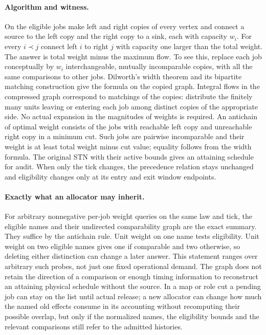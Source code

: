 \documentclass[11pt]{article}
\begin{document}
\paragraph{Algorithm and witness.}
On the eligible jobs make left and right copies of every vertex and connect a source to the left copy and the right copy to a sink, each with capacity $w_i$. For every $i\prec j$ connect left $i$ to right $j$ with capacity one larger than the total weight. The answer is total weight minus the maximum flow. To see this, replace each job conceptually by $w_i$ interchangeable, mutually incomparable copies, with all the same comparisons to other jobs. Dilworth's width theorem and its bipartite matching construction give the formula on the copied graph. Integral flows in the compressed graph correspond to matchings of the copies: distribute the finitely many units leaving or entering each job among distinct copies of the appropriate side. No actual expansion in the magnitudes of weights is required. An antichain of optimal weight consists of the jobs with reachable left copy and unreachable right copy in a minimum cut. Such jobs are pairwise incomparable and their weight is at least total weight minus cut value; equality follows from the width formula. The original STN with their active bounds gives an attaining schedule for audit. When only the tick changes, the precedence relation stays unchanged and eligibility changes only at its entry and exit window endpoints.

\paragraph{Exactly what an allocator may inherit.}
For arbitrary nonnegative per-job weight queries on the same law and tick, the eligible names and their undirected comparability graph are the exact summary. They suffice by the antichain rule. Unit weight on one name tests eligibility. Unit weight on two eligible names gives one if comparable and two otherwise, so deleting either distinction can change a later answer. This statement ranges over arbitrary such probes, not just one fixed operational demand. The graph does not retain the direction of a comparison or enough timing information to reconstruct an attaining physical schedule without the source. In a map or role cut a pending job can stay on the list until actual release; a new allocator can change how much the named old effects consume in its accounting without recomputing their possible overlap, but only if the normalized names, the eligibility bounds and the relevant comparisons still refer to the admitted histories.
\end{document}
